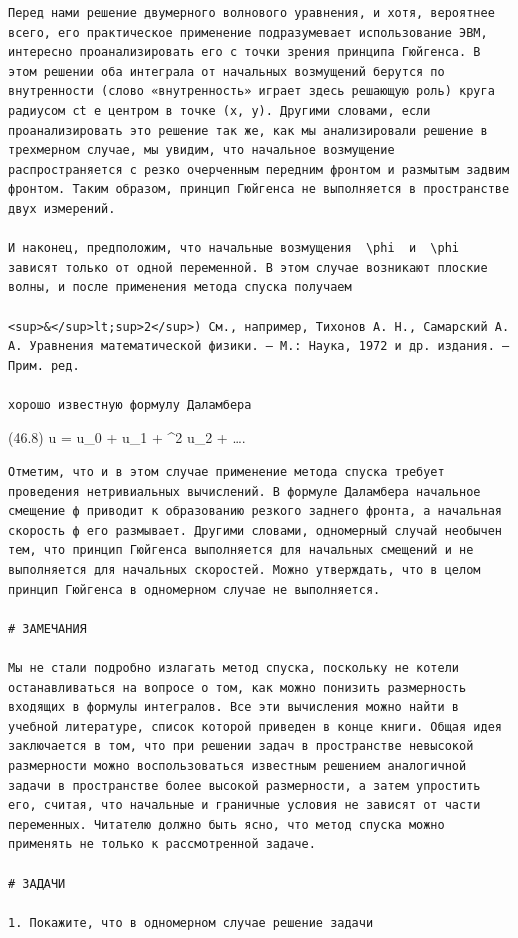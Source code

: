 \documentclass[
  ukrainian,
]{article}
\begin{document}
\begin{verbatim}
Перед нами решение двумерного волнового уравнения, и хотя, вероятнее всего, его практическое применение подразумевает использование ЭВМ, интересно проанализировать его с точки зрения принципа Гюйгенса. В этом решении оба интеграла от начальных возмущений берутся по внутренности (слово «внутренность» играет здесь решающую роль) круга радиусом сt е центром в точке (x, y). Другими словами, если проанализировать это решение так же, как мы анализировали решение в трехмерном случае, мы увидим, что начальное возмущение распространяется с резко очерченным передним фронтом и размытым задвим фронтом. Таким образом, принцип Гюйгенса не выполняется в пространстве двух измерений.

И наконец, предположим, что начальные возмущения  \phi  и  \phi  зависят только от одной переменной. В этом случае возникают плоские волны, и после применения метода спуска получаем

<sup>&</sup>lt;sup>2</sup>) См., например, Тихонов А. Н., Самарский А. А. Уравнения математической физики. — М.: Наука, 1972 и др. издания. — Прим. ред.

хорошо известную формулу Даламбера
\end{verbatim}

(46.8) u = u\_0 + \varepsilon u\_1 + \varepsilon\^{}2 u\_2 + \dots.

\begin{verbatim}
Отметим, что и в этом случае применение метода спуска требует проведения нетривиальных вычислений. В формуле Даламбера начальное смещение ф приводит к образованию резкого заднего фронта, а начальная скорость ф его размывает. Другими словами, одномерный случай необычен тем, что принцип Гюйгенса выполняется для начальных смещений и не выполняется для начальных скоростей. Можно утверждать, что в целом принцип Гюйгенса в одномерном случае не выполняется.

# ЗАМЕЧАНИЯ

Мы не стали подробно излагать метод спуска, поскольку не котели останавливаться на вопросе о том, как можно понизить размерность входящих в формулы интегралов. Все эти вычисления можно найти в учебной литературе, список которой приведен в конце книги. Общая идея заключается в том, что при решении задач в пространстве невысокой размерности можно воспользоваться известным решением аналогичной задачи в пространстве более высокой размерности, а затем упростить его, считая, что начальные и граничные условия не зависят от части переменных. Читателю должно быть ясно, что метод спуска можно применять не только к рассмотренной задаче.

# ЗАДАЧИ

1. Покажите, что в одномерном случае решение задачи
\end{verbatim}
\end{document}
